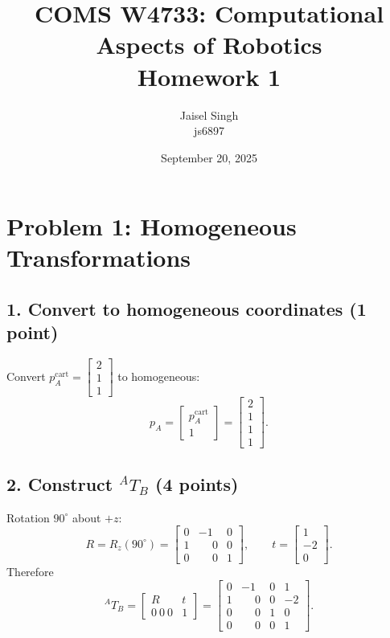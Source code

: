 \documentclass[11pt]{article}
\title{COMS W4733: Computational Aspects of Robotics\\Homework 1}
\author{Jaisel Singh \\ js6897}
\date{September 20, 2025}
\begin{document}
\maketitle

\section*{Problem 1: Homogeneous Transformations}

\subsection*{1. Convert to homogeneous coordinates (1 point)}
Convert $p_A^{\text{cart}} = \begin{bmatrix} 2 \\ 1 \\ 1 \end{bmatrix}$ to homogeneous:
\[
p_A = \begin{bmatrix} p_A^{\text{cart}} \\ 1 \end{bmatrix}
= \begin{bmatrix} 2 \\ 1 \\ 1 \\ 1 \end{bmatrix}.
\]

\subsection*{2. Construct $^{A}\!T_{B}$ (4 points)}
Rotation $90^\circ$ about $+z$:
\[
R = R_z(90^\circ) =
\begin{bmatrix}
0 & -1 & 0\\
1 & \phantom{-}0 & 0\\
0 & \phantom{-}0 & 1
\end{bmatrix},
\qquad
t = \begin{bmatrix} 1 \\ -2 \\ 0 \end{bmatrix}.
\]
Therefore
\[
^{A}\!T_{B}=\begin{bmatrix}R&t\\0~0~0&1\end{bmatrix}
=
\begin{bmatrix}
0 & -1 & 0 & 1\\
1 & \phantom{-}0 & 0 & -2\\
0 & \phantom{-}0 & 1 & 0\\
0 & \phantom{-}0 & 0 & 1
\end{bmatrix}.
\]
\end{document}
